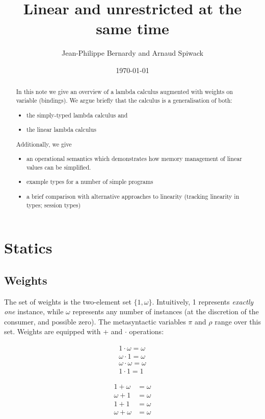 \documentclass[11pt]{article}
\author{Jean-Philippe Bernardy and Arnaud Spiwack}
\date{\today}
\title{Linear and unrestricted at the same time}
\begin{document}
\maketitle
\begin{abstract}
\noindent
In this note we give an overview of a lambda calculus augmented with
weights on variable (bindings). We argue briefly that the calculus is
a generalisation of both:
\begin{itemize}
\item the simply-typed lambda calculus and
\item the linear lambda calculus
\end{itemize}
%
Additionally, we give
\begin{itemize}
\item an operational semantics which demonstrates how memory
  management of linear values can be simplified.
\item example types for a number of simple programs
\item a brief comparison with alternative approaches to linearity
  (tracking linearity in types; session types)
\end{itemize}
\end{abstract}

\section{Statics}
\label{sec:orgheadline8}
\subsection{Weights}
\label{sec:orgheadline1}

The set of weights is the two-element set $\{1,ω\}$. Intuitively, 1
represents \emph{exactly one} instance, while $ω$ represents any
number of instances (at the discretion of the consumer, and possible
zero).  The metasyntactic variables \(π\) and \(ρ\) range over this
set. Weights are equipped with + and $·$ operations:


\begin{align*}
1 · ω = ω \\
ω · 1 = ω \\
ω · ω = ω \\
1 · 1 = 1
\end{align*}

\begin{align*}
1 + ω &= ω \\
ω + 1 &= ω \\
1 + 1 &= ω \\
ω + ω &= ω
\end{align*}
\end{document}
